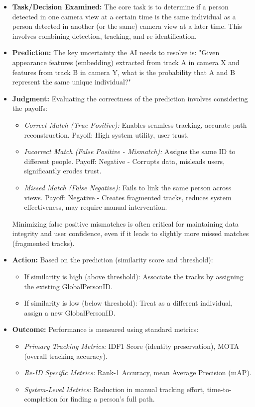 \begin{itemize}
    \item \textbf{Task/Decision Examined:} The core task is to determine if a person detected in one camera view at a certain time is the same individual as a person detected in another (or the same) camera view at a later time. This involves combining detection, tracking, and re-identification.

    \item \textbf{Prediction:} The key uncertainty the AI needs to resolve is: "Given appearance features (embedding) extracted from track A in camera X and features from track B in camera Y, what is the probability that A and B represent the same unique individual?"

    \item \textbf{Judgment:} Evaluating the correctness of the prediction involves considering the payoffs:
        \begin{itemize}
            \item \textit{Correct Match (True Positive):} Enables seamless tracking, accurate path reconstruction. Payoff: High system utility, user trust.
            \item \textit{Incorrect Match (False Positive - Mismatch):} Assigns the same ID to different people. Payoff: Negative - Corrupts data, misleads users, significantly erodes trust.
            \item \textit{Missed Match (False Negative):} Fails to link the same person across views. Payoff: Negative - Creates fragmented tracks, reduces system effectiveness, may require manual intervention.
        \end{itemize}
        Minimizing false positive mismatches is often critical for maintaining data integrity and user confidence, even if it leads to slightly more missed matches (fragmented tracks).

    \item \textbf{Action:} Based on the prediction (similarity score and threshold):
        \begin{itemize}
            \item If similarity is high (above threshold): Associate the tracks by assigning the existing GlobalPersonID.
            \item If similarity is low (below threshold): Treat as a different individual, assign a new GlobalPersonID.
        \end{itemize}

    \item \textbf{Outcome:} Performance is measured using standard metrics:
        \begin{itemize}
            \item \textit{Primary Tracking Metrics:} IDF1 Score (identity preservation), MOTA (overall tracking accuracy).
            \item \textit{Re-ID Specific Metrics:} Rank-1 Accuracy, mean Average Precision (mAP).
            \item \textit{System-Level Metrics:} Reduction in manual tracking effort, time-to-completion for finding a person's full path.
        \end{itemize}


\end{itemize}
